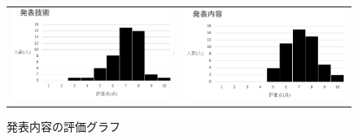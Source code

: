 \begin{figure}[h]
 \begin{tabular}{cc}
  \begin{minipage}[h]{0.45\hsize}
  \centering
 \includegraphics[width=0.7\linewidth]{./figure/evaluation_final-gizyutu2.jpg}
\caption{発表技術の評価グラフ}
\label{evaluation_final-gizyutu2}
 \end{minipage} &

\begin{minipage}[h]{0.45\hsize}
  \centering
 \includegraphics[width=0.7\linewidth]{./figure/evaluation_final-naiyou2.jpg}
 \caption{発表内容の評価グラフ}
\label{evaluation_final-naiyou2}
\end{minipage} 
\end{tabular}
\end{figure}

